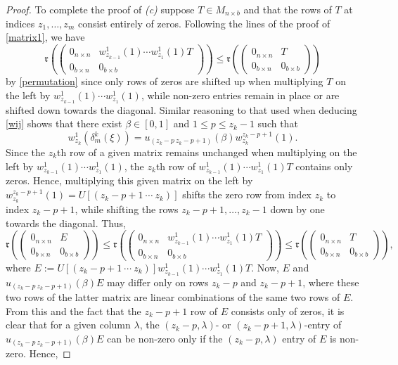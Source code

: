 \documentclass[12pt]{amsart}
\numberwithin{equation}{section}
\theoremstyle{definition}
\theoremstyle{remark}
\begin{document}
\begin{proof}
	To complete the proof of \textit{(c)} suppose $T\in M_{n\times b}$ and that the rows of $T$ at indices $z_{1},\ldots,z_{m}$ consist entirely of zeros. Following the lines of the proof of \autoref{matrix1}, we have
	$$
	\mathfrak{r}\left(
	\begin{pmatrix}
	0_{n\times n} & w_{z_{k-1}}^{1}(1)\cdots w_{z_{1}}^{1}(1)T\\
	0_{b\times n} & 0_{b\times b}
	\end{pmatrix}
	\right)\leq\mathfrak{r}\left(
	\begin{pmatrix}
	0_{n\times n} & T\\
	0_{b\times n} & 0_{b\times b}
	\end{pmatrix}\right)
	$$
	by \autoref{permutation} since only rows of zeros are shifted up when multiplying $T$ on the left by $w_{z_{k-1}}^{1}(1)\cdots w_{z_{1}}^{1}(1)$, while non-zero entries remain in place or are shifted down towards the diagonal. Similar reasoning to that used when deducing \autoref{wij} shows that there exist $\beta\in[0,1]$ and $1\leq p\leq z_{k}-1$ such that
	$$
	w_{z_{k}}^{1}(\delta_{m}^{k}(\xi))=u_{(z_{k} - p \ z_{k}-p+1)}(\beta) w_{z_{k}}^{z_{k}-p+1}(1).
	$$
	Since the $z_{k}$th row of a given matrix remains unchanged when multiplying on the left by $w_{z_{k-1}}^{1}(1)\cdots w_{z_{1}}^{1}(1)$, the $z_{k}$th row of $w_{z_{k-1}}^{1}(1)\cdots w_{z_{1}}^{1}(1)T$ contains only zeros. Hence,  multiplying this given matrix on the left by $w_{z_{k}}^{z_{k}-p+1}(1)=U[(z_{k}-p+1 \ \cdots \ z_{k})]$ shifts the zero row from index $z_{k}$ to index $z_{k}-p+1$, while shifting the rows $z_{k}-p+1,\ldots,z_{k}-1$ down by one towards the diagonal. Thus, 
	$$
	\mathfrak{r}\left(
	\begin{pmatrix}
	0_{n\times n} & E\\
	0_{b\times n} & 0_{b\times b}
	\end{pmatrix}
	\right)\leq
	\mathfrak{r}\left(
	\begin{pmatrix}
	0_{n\times n} & w_{z_{k-1}}^{1}(1)\cdots w_{z_{1}}^{1}(1)T\\
	0_{b\times n} & 0_{b\times b}
	\end{pmatrix}
	\right)\leq\mathfrak{r}\left(
	\begin{pmatrix}
	0_{n\times n} & T\\
	0_{b\times n} & 0_{b\times b}
	\end{pmatrix}\right),
	$$
	where $E:=U[(z_{k}-p+1 \ \cdots \ z_{k})]w_{z_{k-1}}^{1}(1)\cdots w_{z_{1}}^{1}(1)T$. Now, $E$ and $u_{(z_{k}-p \ z_{k}-p+1)}(\beta)E$ may differ only on rows $z_{k}-p$ and $z_{k}-p+1$, where these two rows of the latter matrix are linear combinations of the same two rows of $E$. From this and the fact that the $z_{k}-p+1$ row of $E$ consists only of zeros, it is clear that for a given column $\lambda$, the $(z_{k}-p,\lambda)$- or $(z_{k}-p+1,\lambda)$-entry of $u_{(z_{k}-p \ z_{k}-p+1)}(\beta)E$ can be non-zero only if the $(z_{k}-p,\lambda)$ entry of $E$ is non-zero. Hence, 

\end{proof}
\end{document}
